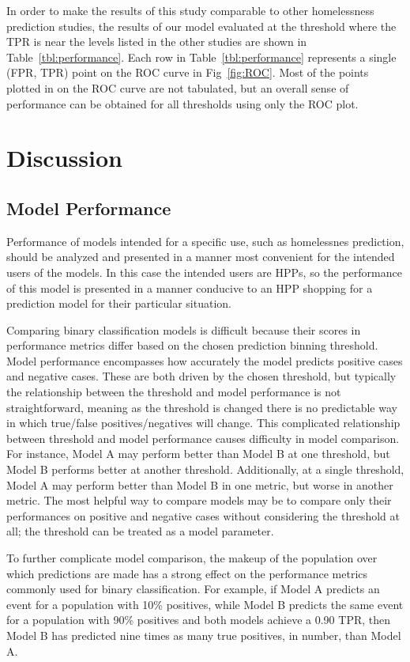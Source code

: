 \documentclass[10pt,letterpaper]{article}
\newcommand{\red}[1]{{\color{red}{#1}}}
\begin{document}
In order to make the results of this study comparable to other homelessness prediction studies, the results of our model evaluated at the threshold where the TPR is near the levels listed in the other studies are shown in Table~\ref{tbl:performance}. Each row in Table~\ref{tbl:performance} represents a single (FPR, TPR) point on the ROC curve in Fig~\ref{fig:ROC}. Most of the points plotted in on the ROC curve are not tabulated, but an overall sense of performance can be obtained for all thresholds using only the ROC plot.

\section*{Discussion}
\subsection*{Model Performance}
Performance of models intended for a specific use, such as homelessnes prediction, should be analyzed and presented in a manner most convenient for the intended users of the models. In this case the intended users are HPPs, so the performance of this model is presented in a manner conducive to an HPP shopping for a prediction model for their particular situation.

Comparing binary classification models is difficult because their scores in performance metrics differ based on the chosen prediction binning threshold. Model performance encompasses how accurately the model predicts positive cases and negative cases. These are both driven by the chosen threshold, but typically the relationship between the threshold and model performance is not straightforward, meaning as the threshold is changed there is no predictable way in which true/false positives/negatives will change. This complicated relationship between threshold and model performance causes difficulty in model comparison. For instance, Model A may perform better than Model B at one threshold, but Model B performs better at another threshold. Additionally, at a single threshold, Model A may perform better than Model B in one metric, but worse in another metric. The most helpful way to compare models may be to compare only their performances on positive and negative cases without considering the threshold at all; the threshold can be treated as a model parameter.

To further complicate model comparison, the makeup of the population over which predictions are made has a strong effect on the performance metrics commonly used for binary classification. For example, if Model A predicts an event for a population with 10\% positives, while Model B predicts the same event for a population with 90\% positives and both models achieve a 0.90 TPR, then Model B has predicted nine times as many true positives, in number, than Model A. \red{REMOVE THIS PARAGRAPH?}
\end{document}
